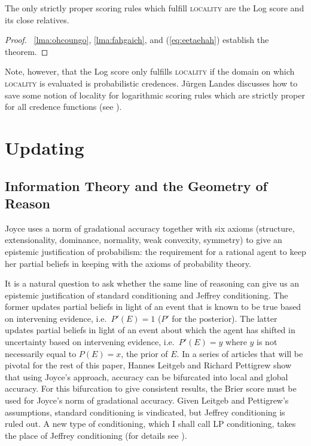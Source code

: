 \documentclass[12pt]{article}
\begin{document}
\begin{theorem}
    \label{thm:ahngeeka}
  The only strictly proper scoring rules which fulfill \textsc{locality} are
  the Log score and its close relatives.
\end{theorem}
\begin{proof}
  \label{prf:ahlaovah}
  {\Emmas}~\ref{lma:ohcoungo}, \ref{lma:fahgaich}, and
  (\ref{eq:eetaehah}) establish the theorem. 
\end{proof}

Note, however, that the Log score only fulfills \textsc{locality} if
the domain on which \textsc{locality} is evaluated is probabilistic
credences. J{\"u}rgen Landes discusses how to save some notion of
locality for logarithmic scoring rules which are strictly proper for
all credence functions (see ).

\section{Updating}
\label{sec:moohoxei}

\subsection{Information Theory and the Geometry of Reason}
\label{subsec:iophufie}

Joyce uses a norm of gradational accuracy together with six axioms
(structure, extensionality, dominance, normality, weak convexity,
symmetry) to give an epistemic justification of probabilism: the
requirement for a rational agent to keep her partial beliefs in
keeping with the axioms of probability theory.

It is a natural question to ask whether the same line of reasoning can
give us an epistemic justification of standard conditioning and
Jeffrey conditioning. The former updates partial beliefs in light of
an event that is known to be true based on intervening evidence, i.e.\
$P'(E)=1$ ($P'$ for the posterior). The latter updates partial beliefs
in light of an event about which the agent has shifted in uncertainty
based on intervening evidence, i.e.\ $P'(E)=y$ where $y$ is not
necessarily equal to $P(E)=x$, the prior of $E$. In a series of
articles that will be pivotal for the rest of this paper, Hannes
Leitgeb and Richard Pettigrew show that using Joyce's approach,
accuracy can be bifurcated into local and global accuracy. For this
bifurcation to give consistent results, the Brier score must be used
for Joyce's norm of gradational accuracy. Given Leitgeb and
Pettigrew's assumptions, standard conditioning is vindicated, but
Jeffrey conditioning is ruled out. A new type of conditioning, which I
shall call LP conditioning, takes the place of Jeffrey conditioning
(for details see \scite{7}{leitgebpettigrew10i}{}).
\end{document}

